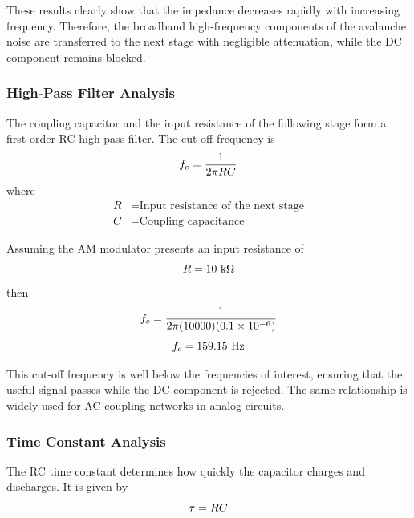 \documentclass[12pt,a4paper]{report}
\begin{document}
	These results clearly show that the impedance decreases rapidly with increasing frequency. Therefore, the broadband high-frequency components of the avalanche noise are transferred to the next stage with negligible attenuation, while the DC component remains blocked.
	
	
	\subsubsection{High-Pass Filter Analysis}
	The coupling capacitor and the input resistance of the following stage form a first-order RC high-pass filter. The cut-off frequency is
	\begingroup
	\setlength{\mathindent}{0pt}
	\begin{equation*}
		\hfill
		f_c = \frac{1}{2\pi RC}
		\hfill
	\end{equation*}
	\endgroup
	where
	\begin{align*}
		R &= \text{Input resistance of the next stage} \\
		C &= \text{Coupling capacitance}
	\end{align*}
	
	Assuming the AM modulator presents an input resistance of
	\begingroup
	\setlength{\mathindent}{0pt}
	\begin{equation*}
		\hfill
		R = 10\ \text{k}\Omega
		\hfill
	\end{equation*}
	\endgroup
	then
	\begingroup
	\setlength{\mathindent}{0pt}
	\begin{equation*}
		\hfill
		f_c = \frac{1}{2\pi(10000)(0.1 \times 10^{-6})}
		\hfill
	\end{equation*}
	\endgroup
	\begingroup
	\setlength{\mathindent}{0pt}
	\begin{equation*}
		\hfill
		f_c = 159.15\ \text{Hz}
		\hfill
	\end{equation*}
	\endgroup
	
	This cut-off frequency is well below the frequencies of interest, ensuring that the useful signal passes while the DC component is rejected. The same relationship is widely used for AC-coupling networks in analog circuits.
	
	\subsubsection{Time Constant Analysis}
	The RC time constant determines how quickly the capacitor charges and discharges. It is given by
	\begingroup
	\setlength{\mathindent}{0pt}
	\begin{equation*}
		\hfill
		\tau = RC
		\hfill
	\end{equation*}
	\endgroup
	
\end{document}
